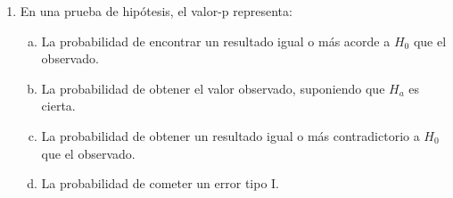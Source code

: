 \documentclass[a4paper]{article}
\begin{document}
\begin{enumerate}
\item En una prueba de hipótesis, el valor-p representa:
\begin{enumerate}[a)]
    \item La probabilidad de encontrar un resultado igual o más acorde a $H_0$ que el observado.
    \item La probabilidad de obtener el valor observado, suponiendo que $H_a$ es cierta.
    \item La probabilidad de obtener un resultado igual o más contradictorio a $H_0$ que el observado.
    \item La probabilidad de cometer un error tipo I.
\end{enumerate}

\end{enumerate}


 
\end{document}
